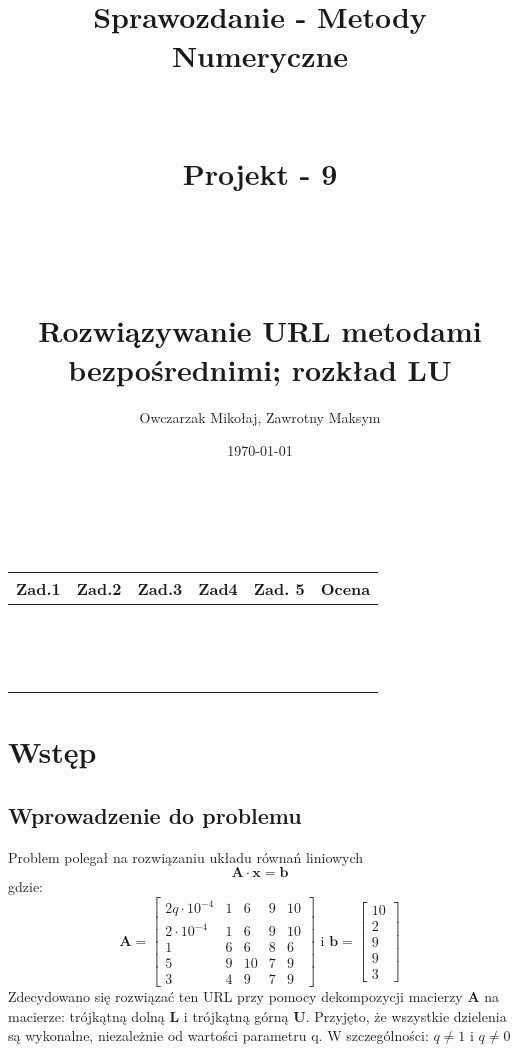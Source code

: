 \documentclass[a4paper]{article}
\title{Sprawozdanie - Metody Numeryczne \\~~
\\~~\\
 Projekt - 9\\~~\\
~~\\
~~\\
Rozwiązywanie URL metodami bezpośrednimi; rozkład LU}
\author{Owczarzak Mikołaj, Zawrotny Maksym}
\date{\today}
\begin{document}
\maketitle
~~\\
~~\\
\begin{table}[h]
\centering
\begin{tabular}{|c|c|c|c|c|c|}
\hline
Zad.1&Zad.2&Zad.3&Zad4&Zad. 5&Ocena\\\hline
~~&~~&~~&~~&~~&~~\\
~~&~~&~~&~~&~~&~~\\
~~&~~&~~&~~&~~&~~\\\hline
\end{tabular}
\end{table}
\newpage
\section{Wstęp}
\subsection{Wprowadzenie do problemu}
Problem polegał na rozwiązaniu układu równań liniowych
$$
\textbf{A}\cdot \textbf{x}=\textbf{b}
$$
gdzie:
$$
\textbf{A}=
\left[
\begin{array}{ccccc}
2q\cdot 10^{-4} & 1&6&9&10\\
2\cdot 10^{-4}&1&6&9&10\\
1&6&6&8&6\\
5&9&10&7&9\\
3&4&9&7&9
\end{array}
\right]
\textrm{ i }
\textbf{b}=
\left[
\begin{array}{c}
10\\
2\\
9\\
9\\
3
\end{array}
\right]
$$
Zdecydowano się rozwiązać ten URL przy pomocy dekompozycji macierzy \textbf{A} na macierze: trójkątną dolną \textbf{L} i trójkątną górną \textbf{U}. Przyjęto, że wszystkie dzielenia są wykonalne, niezależnie od wartości parametru q. W szczególności: $q\neq 1$ i $q\neq 0$
\end{document}
